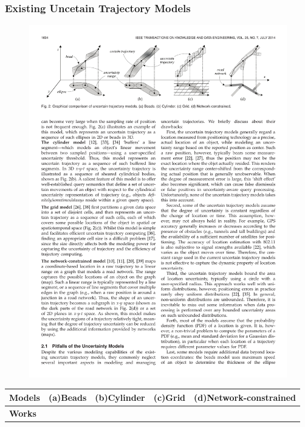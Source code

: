 
\begin{frame}
\frametitle{Existing Uncetain Trajectory Models}

\begin{figure}[tb]
  \includegraphics[width=\columnwidth]{figures/5-1/5-1-1.pdf}
\end{figure}

\vspace{10pt}

\footnotesize
\begin{tabular}{|l|c|c|c|c|}
\hline
\textbf{Models} & (a)Beads & (b)Cylinder & (c)Grid & (d)Network-constrained\\
\hline
\textbf{Works} & \cite{hornsby2002modeling,kuijpers2007trajectory} & \cite{frentzos2009effect,trajcevski2004managing,trajcevski2002geometry} & \cite{pelekis2009clustering,zhang2009effectively} & \cite{ding2008utr,ding2004uncertainty}\\
\hline
\end{tabular}

\end{frame}

